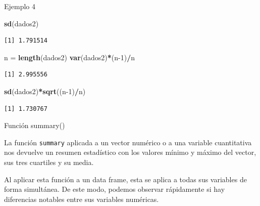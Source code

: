\documentclass[
  ignorenonframetext,
]{beamer}
\newenvironment{Shaded}{\begin{snugshade}}{\end{snugshade}}
\newcommand{\DecValTok}[1]{\textcolor[rgb]{0.00,0.00,0.81}{#1}}
\newcommand{\KeywordTok}[1]{\textcolor[rgb]{0.13,0.29,0.53}{\textbf{#1}}}
\newcommand{\NormalTok}[1]{#1}
\newcommand{\OperatorTok}[1]{\textcolor[rgb]{0.81,0.36,0.00}{\textbf{#1}}}
\newcommand{\StringTok}[1]{\textcolor[rgb]{0.31,0.60,0.02}{#1}}
\begin{document}
\begin{frame}[fragile]{Ejemplo 4}
\protect\hypertarget{ejemplo-4-2}{}

\begin{Shaded}
\begin{Highlighting}[]
\KeywordTok{sd}\NormalTok{(dados2)}
\end{Highlighting}
\end{Shaded}

\begin{verbatim}
[1] 1.791514
\end{verbatim}

\begin{Shaded}
\begin{Highlighting}[]
\NormalTok{n =}\StringTok{ }\KeywordTok{length}\NormalTok{(dados2)}
\KeywordTok{var}\NormalTok{(dados2)}\OperatorTok{*}\NormalTok{(n}\DecValTok{-1}\NormalTok{)}\OperatorTok{/}\NormalTok{n}
\end{Highlighting}
\end{Shaded}

\begin{verbatim}
[1] 2.995556
\end{verbatim}

\begin{Shaded}
\begin{Highlighting}[]
\KeywordTok{sd}\NormalTok{(dados2)}\OperatorTok{*}\KeywordTok{sqrt}\NormalTok{((n}\DecValTok{-1}\NormalTok{)}\OperatorTok{/}\NormalTok{n)}
\end{Highlighting}
\end{Shaded}

\begin{verbatim}
[1] 1.730767
\end{verbatim}

\end{frame}

\begin{frame}[fragile]{Función summary()}
\protect\hypertarget{funciuxf3n-summary}{}

La función \texttt{summary} aplicada a un vector numérico o a una
variable cuantitativa nos devuelve un resumen estadístico con los
valores mínimo y máximo del vector, sus tres cuartiles y su media.

Al aplicar esta función a un data frame, esta se aplica a todas sus
variables de forma simultánea. De este modo, podemos observar
rápidamente si hay diferencias notables entre sus variables numéricas.

\end{frame}
\end{document}
